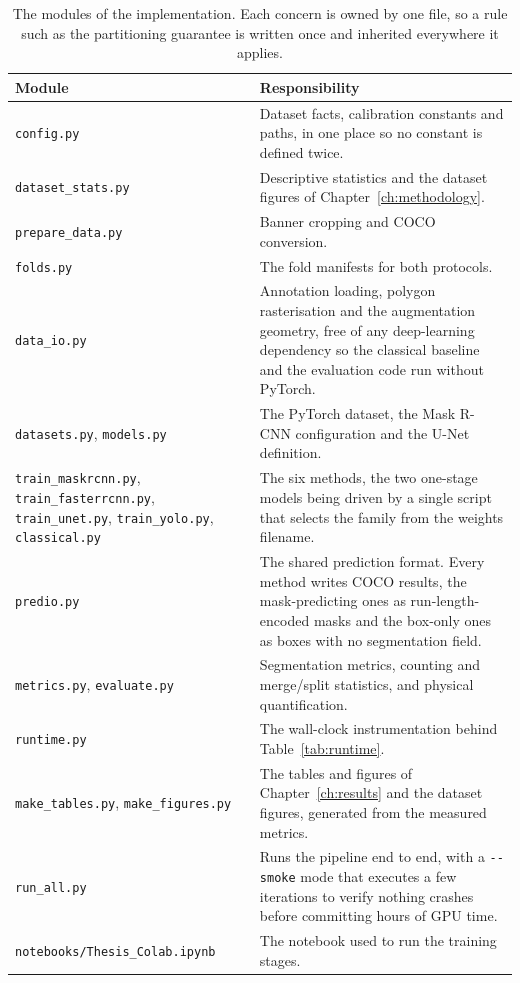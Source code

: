 \begin{table}[htbp]
    \centering
    \caption{The modules of the implementation. Each concern is owned by one
    file, so a rule such as the partitioning guarantee is written once and
    inherited everywhere it applies.}
    \label{tab:modules}
    \begin{tabular}{p{}p{}}
        \toprule
        Module & Responsibility \\
        \midrule
        \texttt{config.py} & Dataset facts, calibration constants and paths, in one place so no constant is defined twice. \\
        \texttt{dataset\_stats.py} & Descriptive statistics and the dataset figures of Chapter~\ref{ch:methodology}. \\
        \texttt{prepare\_data.py} & Banner cropping and COCO conversion. \\
        \texttt{folds.py} & The fold manifests for both protocols. \\
        \texttt{data\_io.py} & Annotation loading, polygon rasterisation and the augmentation geometry, free of any deep-learning dependency so the classical baseline and the evaluation code run without PyTorch. \\
        \texttt{datasets.py}, \texttt{models.py} & The PyTorch dataset, the Mask R-CNN configuration and the U-Net definition. \\
        \texttt{train\_maskrcnn.py}, \texttt{train\_fasterrcnn.py}, \texttt{train\_unet.py}, \texttt{train\_yolo.py}, \texttt{classical.py} & The six methods, the two one-stage models being driven by a single script that selects the family from the weights filename. \\
        \texttt{predio.py} & The shared prediction format. Every method writes COCO results, the mask-predicting ones as run-length-encoded masks and the box-only ones as boxes with no segmentation field. \\
        \texttt{metrics.py}, \texttt{evaluate.py} & Segmentation metrics, counting and merge/split statistics, and physical quantification. \\
        \texttt{runtime.py} & The wall-clock instrumentation behind Table~\ref{tab:runtime}. \\
        \texttt{make\_tables.py}, \texttt{make\_figures.py} & The tables and figures of Chapter~\ref{ch:results} and the dataset figures, generated from the measured metrics. \\
        \texttt{run\_all.py} & Runs the pipeline end to end, with a \texttt{-{}-smoke} mode that executes a few iterations to verify nothing crashes before committing hours of GPU time. \\
        \texttt{notebooks/Thesis\_Colab.ipynb} & The notebook used to run the training stages. \\
        \bottomrule
    \end{tabular}
\end{table}

